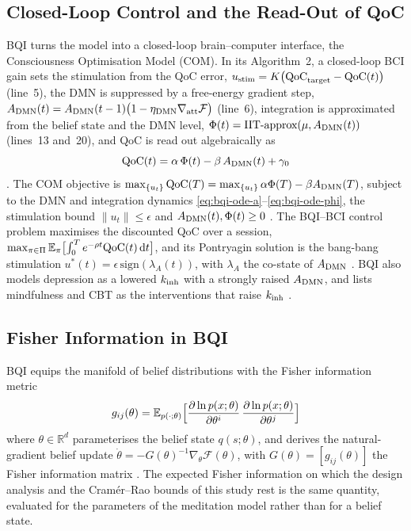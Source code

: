 \subsection{Closed-Loop Control and the Read-Out of QoC}
\label{sec:theory-com}
BQI turns the model into a closed-loop brain--computer interface, the Consciousness Optimisation Model (COM). In its Algorithm~2, a closed-loop BCI gain sets the stimulation from the QoC error, $u_{\mathrm{stim}}=K\bigl(\mathrm{QoC}_{\mathrm{target}}-\mathrm{QoC}(t)\bigr)$ (line~5), the DMN is suppressed by a free-energy gradient step, $A_{\mathrm{DMN}}(t)=A_{\mathrm{DMN}}(t-1)\bigl(1-\eta_{\mathrm{DMN}}\nabla_{\mathrm{att}}\mathcal F\bigr)$ (line~6), integration is approximated from the belief state and the DMN level, $\Phi(t)=\text{IIT-approx}(\mu,A_{\mathrm{DMN}}(t))$ (lines~13 and~20), and QoC is read out algebraically as
\begin{equation}
  \mathrm{QoC}(t)=\alpha\,\Phi(t)-\beta\,A_{\mathrm{DMN}}(t)+\gamma_0
  \label{eq:bqi-readout}
\end{equation}
\cite[Sec.~9.3, Alg.~2, line~21]{BQI}. The COM objective is $\max_{\{u_t\}}\mathrm{QoC}(T)=\max_{\{u_t\}}\alpha\Phi(T)-\beta A_{\mathrm{DMN}}(T)$, subject to the DMN and integration dynamics \eqref{eq:bqi-ode-a}--\eqref{eq:bqi-ode-phi}, the stimulation bound $\|u_t\|\le\epsilon$ and $A_{\mathrm{DMN}}(t),\Phi(t)\ge0$ \cite[Sec.~9.4, eqs.~(69)--(73)]{BQI}. The BQI--BCI control problem maximises the discounted QoC over a session, $\max_{\pi\in\Pi}\mathbb E_\pi\bigl[\int_0^T e^{-\rho t}\mathrm{QoC}(t)\,\mathrm{d} t\bigr]$, and its Pontryagin solution is the bang-bang stimulation $u^*(t)=\epsilon\,\mathrm{sign}(\lambda_A(t))$, with $\lambda_A$ the co-state of $A_{\mathrm{DMN}}$ \cite[Sec.~10.1, eqs.~(74)--(75)]{BQI}. BQI also models depression as a lowered $k_{\mathrm{inh}}$ with a strongly raised $A_{\mathrm{DMN}}$, and lists mindfulness and CBT as the interventions that raise $k_{\mathrm{inh}}$ \cite[Table~10]{BQI}.

\subsection{Fisher Information in BQI}
\label{sec:theory-fisher}
BQI equips the manifold of belief distributions with the Fisher information metric
\begin{equation}
  g_{ij}(\theta)=\mathbb E_{p(\cdot;\theta)}\Bigl[\frac{\partial\ln p(x;\theta)}{\partial\theta^i}\,\frac{\partial\ln p(x;\theta)}{\partial\theta^j}\Bigr]
  \label{eq:bqi-fisher}
\end{equation}
where $\theta\in\mathbb R^d$ parameterises the belief state $q(s;\theta)$, and derives the natural-gradient belief update $\dot\theta=-G(\theta)^{-1}\nabla_\theta\mathcal F(\theta)$, with $G(\theta)=[g_{ij}(\theta)]$ the Fisher information matrix \cite[Sec.~12.1, eqs.~(79)--(80)]{BQI}. The expected Fisher information on which the design analysis and the Cram\'er--Rao bounds of this study rest is the same quantity, evaluated for the parameters of the meditation model rather than for a belief state.

